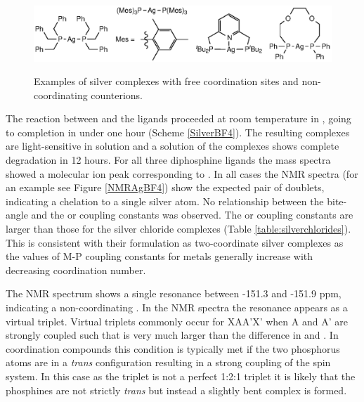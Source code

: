 \begin{figure}[htbp]
\begin{center}
\vspace{0.5cm}
\includegraphics{../Figures/Linearsilvercomplexes.eps}
\caption[Examples of silver complexes with free coordination sites and non-coordinating  counterions]{Examples of silver complexes with free coordination sites and non-coordinating  counterions.\cite{Ainscough2011, Bayler1996, Vlugt2009b, Heuer2000}}
\vspace{0.2cm}
\label{Linearsilver}
\vspace{0.2cm}
\end{center}
\end{figure}
\vspace{0.2cm}

The reaction between  and the \tBuxantphos{} ligands proceeded at room temperature in , going to completion in under one hour (Scheme \ref{SilverBF4}).  The resulting complexes are light-sensitive in solution and a  solution of the complexes shows complete degradation in 12 hours.  For all three diphosphine ligands the mass spectra showed a molecular ion peak corresponding to \ce{[Ag(diphosphine)]+}. In all cases the \phosphorus{} NMR spectra (for an example see Figure \ref{NMRAgBF4}) show the expected pair of doublets, indicating a chelation to a single silver atom.  No relationship between the bite-angle and the \JAgPseven{} or \JAgPnine{} coupling constants was observed.  The \JAgPseven{} or \JAgPnine{} coupling constants are larger than those for the silver chloride complexes (Table \ref{table:silverchlorides}).  This is consistent with their formulation as two-coordinate silver complexes as the values of M-P coupling constants for  metals generally increase with decreasing coordination number.  

The \fluorine{} NMR spectrum shows a single resonance between -151.3 and -151.9 ppm, indicating a non-coordinating .  In the \proton{} NMR spectra the \tBu{} resonance appears as a virtual triplet.  Virtual triplets commonly occur for XAA'X' when A and A' are strongly coupled such that  is very much larger than the difference in  and .  In coordination compounds this condition is typically met if the two phosphorus atoms are in a \emph{trans} configuration resulting in a strong coupling of the spin system.  In this case as the triplet is not a perfect 1:2:1 triplet it is likely that the phosphines are not strictly \emph{trans} but instead a slightly bent complex is formed.  

